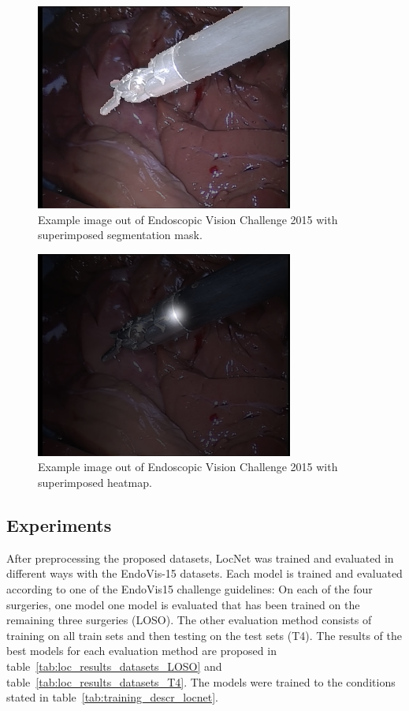 \documentclass[conference]{IEEEtran}
\begin{document}
\begin{figure}%
\centering
\includegraphics[width=0.6\linewidth]{../images/dataset/robotic15_segm/frame001_dataset2_superimposed_mask-.png}
\caption{Example image out of Endoscopic Vision Challenge 2015 with superimposed segmentation mask.}
\label{img:endo_vis15_example_frame_mask}
\end{figure}

\begin{figure}%
\centering
\includegraphics[width=0.6\linewidth]{../images/dataset/robotic15_segm/img+heatmap_1instrument.png}
\caption{Example image out of Endoscopic Vision Challenge 2015 with superimposed heatmap.}
\label{img:endo_vis15_example_frame_heatmap}
\end{figure}


\subsection{Experiments}
After preprocessing the proposed datasets, LocNet was
trained and evaluated in different ways with the \mbox{EndoVis-15}
datasets. Each model is trained and evaluated according to one of the EndoVis15 challenge guidelines: On each of the four surgeries, one model one model is evaluated that has been trained on the remaining three surgeries (LOSO). The other evaluation method consists of training on all train sets and then testing on the test sets (T4).
The results of the best models for each evaluation method are proposed in table~\ref{tab:loc_results_datasets_LOSO} and table~\ref{tab:loc_results_datasets_T4}.
The models were trained to the conditions stated in table~\ref{tab:training_descr_locnet}.
\end{document}
